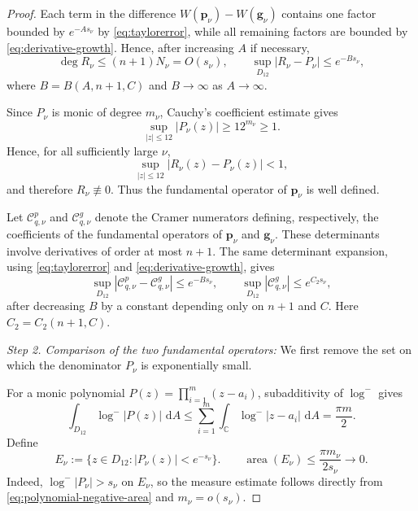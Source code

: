 \documentclass[12pt,letterpaper,reqno]{amsart}
\theoremstyle{definition}
\numberwithin{equation}{section}
\newcommand{\C}{\mathbb C}
\newcommand{\dA}{\,\mathrm dA}
\DeclareMathOperator{\meas}{area}
\newcommand{\gv}{\bm g}
\newcommand{\pv}{\bm p}
\begin{document}
\begin{proof}
Each term in the difference
\(W(\pv_\nu)-W(\gv_\nu)\) contains one factor bounded by
\(e^{-As_\nu}\) by \eqref{eq:taylorerror}, while all remaining factors
are bounded by \eqref{eq:derivative-growth}. Hence, after increasing
\(A\) if necessary,
\begin{equation}\label{eq:wronskiapprox}
 \deg R_\nu\leq (n+1)N_\nu=O(s_\nu),
 \qquad
 \sup_{D_{12}}|R_\nu-P_\nu|
 \leq e^{-Bs_\nu},
\end{equation}
where \(B=B(A,{n+1},C)\) and \(B\to\infty\) as \(A\to\infty\).

Since \(P_\nu\) is monic of degree \(m_\nu\), Cauchy's coefficient
estimate gives
\[
 \sup_{|z|\leq12}|P_\nu(z)|\geq12^{m_\nu}\geq1.
\]
Hence, for all sufficiently large \(\nu\),
\[
 \sup_{|z|\leq12}|R_\nu(z)-P_\nu(z)|<1,
\]
and therefore \(R_\nu\not\equiv0\). Thus the fundamental operator of
\(\pv_\nu\) is well defined.


Let \(\mathcal C_{q,\nu}^p\) and \(\mathcal C_{q,\nu}^g\) denote the
Cramer numerators defining, respectively, the coefficients of the
fundamental operators of \(\pv_\nu\) and \(\gv_\nu\). These
determinants involve derivatives of order at most \({n+1}\). The same
determinant expansion, using \eqref{eq:taylorerror} and
\eqref{eq:derivative-growth}, gives
\begin{equation}\label{eq:cramer-numerator-approx}
 \sup_{D_{12}}
 |\mathcal C_{q,\nu}^p-\mathcal C_{q,\nu}^g|
 \leq e^{-Bs_\nu},
 \qquad
 \sup_{D_{12}}|\mathcal C_{q,\nu}^g|
 \leq e^{C_2s_\nu},
\end{equation}
after decreasing \(B\) by a constant depending only on \({n+1}\) and
\(C\). Here \(C_2=C_2({n+1},C)\).


\medskip\noindent
\emph{{Step 2. Comparison of the two fundamental operators:}}
We first remove the set on which the denominator \(P_\nu\) is
exponentially small.

For a monic polynomial
\(P(z)=\prod_{i=1}^{m}(z-a_i)\), subadditivity of \(\log^-\) gives
\begin{equation}\label{eq:polynomial-negative-area}
 \int_{D_{12}}\log^-|P(z)|\,\dA
 \leq
 \sum_{i=1}^{m}
 \int_{\C}\log^-|z-a_i|\,\dA
 =
 \frac{\pi m}{2}.
\end{equation}
Define
\begin{equation}\label{eq:smallvalues}
 E_\nu
 :=
 \{z\in D_{12}:|P_\nu(z)|<e^{-s_\nu}\}.
 \qquad
 \meas(E_\nu)
 \leq
 \frac{\pi m_\nu}{2s_\nu}
 \longrightarrow0.
\end{equation}
Indeed, \(\log^-|P_\nu|>s_\nu\) on \(E_\nu\), so the measure estimate
follows directly from \eqref{eq:polynomial-negative-area} and
\(m_\nu=o(s_\nu)\).


\end{proof}
\end{document}
